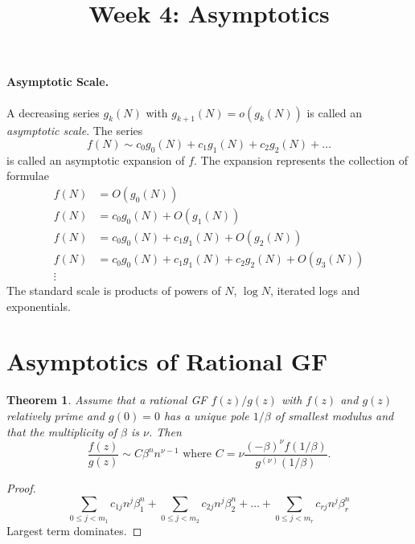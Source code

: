 \documentclass{article}
\newtheorem{theorem}{Theorem}
\begin{document}
\title{Week 4: Asymptotics}
\maketitle

\paragraph{Asymptotic Scale.} A decreasing series $g_k(N)$ with $g_{k+1}(N) =
o(g_k(N))$ is called an \emph{asymptotic scale}. The series \begin{equation*}
  f(N) \sim c_0g_0(N) + c_1g_1(N) + c_2g_2(N) + \ldots
\end{equation*} is called an asymptotic expansion of $f$. The expansion
represents the collection of formulae \begin{align*}
  f(N) &= O(g_0(N)) \\
  f(N) &= c_0g_0(N) + O(g_1(N)) \\
  f(N) &= c_0g_0(N) + c_1g_1(N) + O(g_2(N)) \\
  f(N) &= c_0g_0(N) + c_1g_1(N) + c_2g_2(N) + O(g_3(N)) \\
  \vdots
\end{align*} The standard scale is products of powers of $N$, $\log N$,
iterated logs and exponentials.

\section{Asymptotics of Rational GF}

\begin{theorem}
  Assume that a rational GF $f(z)/g(z)$ with $f(z)$ and $g(z)$ relatively
  prime and $g(0) = 0$ has a unique pole $1/\beta$ of smallest modulus and that
  the multiplicity of $\beta$ is $\nu$. Then \begin{equation*}
    [z^n]\frac{f(z)}{g(z)} \sim C\beta^nn^{\nu - 1} \text{ where } C = \nu
      \frac{(-\beta)^{\nu}f(1/\beta)}{g^{(\nu)}(1/\beta)}.
  \end{equation*}
\end{theorem}

\begin{proof}
  \begin{equation*}
    \sum_{0 \leq j < m_1} c_{1j}n^j\beta_1^n + \sum_{0 \leq j < m_2}c_{2j}n^j
      \beta_2^n + \ldots + \sum_{0 \leq j < m_r}c_{rj}n^j\beta_r^n
  \end{equation*} Largest term dominates.
\end{proof}
\end{document}
